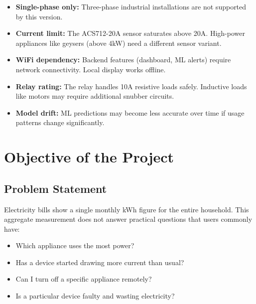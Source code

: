 \documentclass[12pt, a4paper]{article}
\begin{document}
	\begin{itemize}[itemsep=2pt, topsep=6pt]
		\item \textbf{Single-phase only:} Three-phase industrial installations are not supported by this version.
		
		\item \textbf{Current limit:} The ACS712-20A sensor saturates above 20A. High-power appliances like geysers (above 4kW) need a different sensor variant.
		
		\item \textbf{WiFi dependency:} Backend features (dashboard, ML alerts) require network connectivity. Local display works offline.
		
		\item \textbf{Relay rating:} The relay handles 10A resistive loads safely. Inductive loads like motors may require additional snubber circuits.
		
		\item \textbf{Model drift:} ML predictions may become less accurate over time if usage patterns change significantly.
	\end{itemize}
	
	\newpage
	
	\section{Objective of the Project}
	
	\subsection{Problem Statement}
	
	Electricity bills show a single monthly kWh figure for the entire household. This aggregate measurement does not answer practical questions that users commonly have:
	
	\begin{itemize}[itemsep=1pt, topsep=1pt]
		\item Which appliance uses the most power?
		\item Has a device started drawing more current than usual?
		\item Can I turn off a specific appliance remotely?
		\item Is a particular device faulty and wasting electricity?
	\end{itemize}
	
\end{document}
